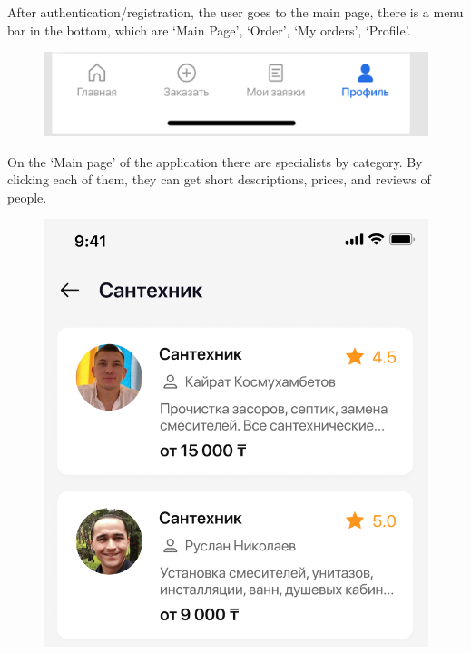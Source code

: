 After authentication/registration, the user goes to the main page, there is a menu bar in the bottom, which are ‘Main Page’, ‘Order’, ‘My orders’, ‘Profile’.
\begin{figure}[H]
    \centering
    \includegraphics[scale=0.55]{images/func2.png}
\end{figure}
On the ‘Main page’ of the application there are specialists by category. By clicking each of them, they can get short descriptions, prices, and reviews of people.
\begin{figure}[H]
    \centering
    \includegraphics[scale=0.55]{images/func3.png}

\end{figure}

